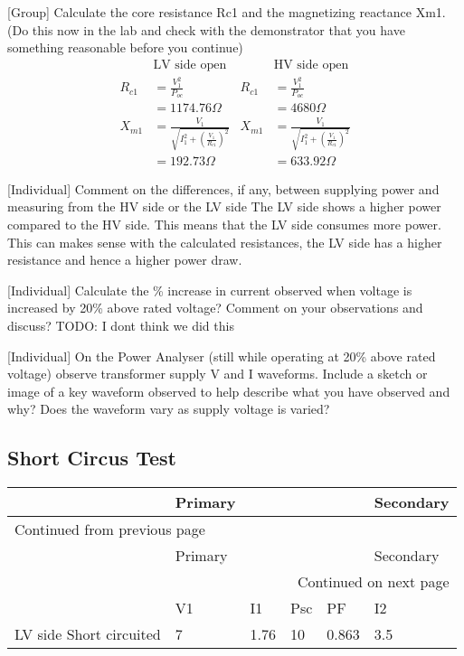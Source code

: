 \documentclass[11pt]{article}
\begin{document}
{[}Group] Calculate the core resistance Rc1 and the magnetizing reactance Xm1. (Do this now in the lab and check with the demonstrator that you have something reasonable before you continue)
\begin{align*}
&\textrm{LV side open} & &\textrm{HV side open} \\
R_{c1}&=\frac{V_1^2}{P_{oc}} & R_{c1}&=\frac{V_1^2}{P_{oc}} \\
&=1174.76\Omega & &=4680\Omega \\
X_{m1}&=\frac{V_1}{\sqrt{I_1^2+\left(\frac{V_1}{R_{c1}}\right)^2}} & X_{m1}&=\frac{V_1}{\sqrt{I_1^2+\left(\frac{V_1}{R_{c1}}\right)^2}} \\
&=192.73\Omega & &=633.92\Omega
\end{align*}

{[}Individual] Comment on the differences, if any, between supplying power and measuring from
the HV side or the LV side The LV side shows a higher power compared to the HV side. This means that the LV side consumes more power. This can makes sense with the calculated resistances, the LV side has a higher resistance and hence a higher power draw.

{[}Individual] Calculate the \% increase in current observed when voltage is increased by 20\% above rated voltage? Comment on your observations and discuss?
TODO: I dont think we did this

{[}Individual] On the Power Analyser (still while operating at 20\% above rated voltage) observe transformer supply V and I waveforms. Include a sketch or image of a key waveform observed to help describe what you have observed and why? Does the waveform vary as supply voltage is varied?
\subsection{Short Circus Test}
\label{sec:org4254d38}
\begin{longtable}{|l|l|l|l|l|l|}
\hline
 & Primary &  &  &  & Secondary\\
\hline
\endfirsthead
\multicolumn{6}{l}{Continued from previous page} \\
\hline

 & Primary &  &  &  & Secondary \\

\hline
\endhead
\hline\multicolumn{6}{r}{Continued on next page} \\
\endfoot
\endlastfoot
\hline
 & V1 & I1 & Psc & PF & I2\\
\hline
LV side Short circuited & 7 & 1.76 & 10 & 0.863 & 3.5\\
\hline
\end{longtable}
\end{document}
